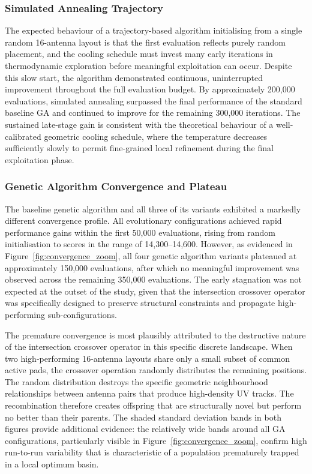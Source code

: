 \documentclass[conference]{IEEEtran}
\begin{document}
\subsubsection{Simulated Annealing Trajectory}
The expected behaviour of a trajectory-based
algorithm initialising from a single random 16-antenna layout is that the first evaluation reflects
purely random placement, and the cooling schedule must invest many early iterations in
thermodynamic exploration before meaningful exploitation can occur. Despite this slow start,
the algorithm demonstrated continuous, uninterrupted improvement throughout the full evaluation
budget. By approximately 200,000 evaluations, simulated annealing surpassed the final
performance of the standard baseline GA and continued to improve for the remaining 300,000
iterations. The sustained late-stage gain is consistent with the theoretical behaviour of a
well-calibrated geometric cooling schedule, where the temperature decreases sufficiently
slowly to permit fine-grained local refinement during the final exploitation phase.
 
\subsubsection{Genetic Algorithm Convergence and Plateau}
The baseline genetic algorithm and all three of its variants exhibited a markedly different
convergence profile. All evolutionary configurations achieved rapid performance gains within
the first 50,000 evaluations, rising from random initialisation to scores in the range of
14,300--14,600. However, as evidenced in Figure~\ref{fig:convergence_zoom}, all four genetic
algorithm variants plateaued at approximately 150,000 evaluations, after which no meaningful
improvement was observed across the remaining 350,000 evaluations. The early stagnation was
not expected at the outset of the study, given that the intersection crossover operator was
specifically designed to preserve structural constraints and propagate high-performing
sub-configurations.
 
The premature convergence is most plausibly attributed to the destructive nature of the
intersection crossover operator in this specific discrete landscape. When two high-performing
16-antenna layouts share only a small subset of common active pads, the crossover operation
randomly distributes the remaining positions. The random distribution destroys the specific
geometric neighbourhood relationships between antenna pairs that produce high-density UV tracks.
The recombination therefore creates offspring that are structurally novel but perform no better
than their parents. The shaded standard deviation bands in both figures provide additional
evidence: the relatively wide bands around all GA configurations, particularly visible in
Figure~\ref{fig:convergence_zoom}, confirm high run-to-run variability that is characteristic
of a population prematurely trapped in a local optimum basin.
 
\end{document}
